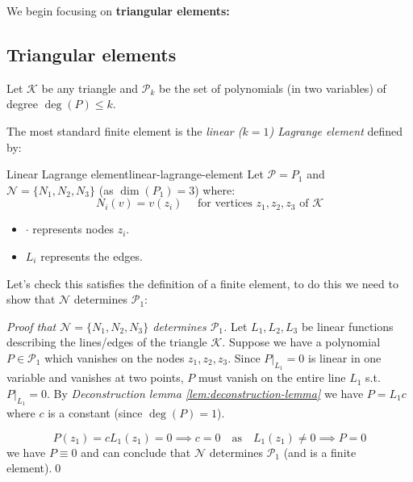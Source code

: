 We begin focusing on \textbf{triangular elements:}

\subsection{Triangular elements}
Let $\mathcal{K}$ be any triangle and $\mathcal{P}_k$ be the set of polynomials (in two variables) of degree $\deg(P) \leq k$.

The most standard finite element is the \emph{linear ($k=1$) Lagrange element} defined by:

\begin{definition}{Linear Lagrange element}{linear-lagrange-element}
    Let $\mathcal{P} = P_1$ and $\mathcal{N} = \{N_1, N_2, N_3\}$ (as $\dim(P_1) = 3$) where:
    \[
        N_i(v) = v(z_i) \quad \text{ for vertices } z_1, z_2, z_3 \text{ of } \mathcal{K}
    \]
\end{definition}
\begin{center}
\end{center}
\begin{itemize}
    \item $\cdot$ represents nodes $z_i$.
    \item $L_i$ represents the edges.
\end{itemize}

Let's check this satisfies the definition of a finite element, to do this we need to show that $\mathcal{N}$ determines $\mathcal{P}_1$:
\begin{proof}[Proof that $\mathcal{N}=\{N_1, N_2, N_3\}$ determines $\mathcal{P}_1$]

    \medskip

Let $L_1, L_2, L_3$ be linear functions describing the lines/edges of the triangle $\mathcal{K}$.
\medskip
Suppose we have a polynomial $P \in \mathcal{P}_1$ which vanishes on the nodes $z_1, z_2, z_3$.
\medskip
Since $P|_{L_1} = 0$ is linear in one variable and vanishes at two points, $P$ must vanish on the entire line $L_1$ s.t. $P|_{L_1} = 0$.
By \emph{Deconstruction lemma \ref{lem:deconstruction-lemma}} we have $P = L_1 c$ where $c$ is a constant (since $\deg(P) = 1$).

\[
    P(z_1) = c L_1(z_1) = 0 \implies c = 0 \quad \text{as} \quad L_1(z_1) \neq 0 \implies P = 0
\]
we have $P \equiv 0$ and can conclude that $\mathcal{N}$ determines $\mathcal{P}_1$ (and is a finite element).\qed
\end{proof}

